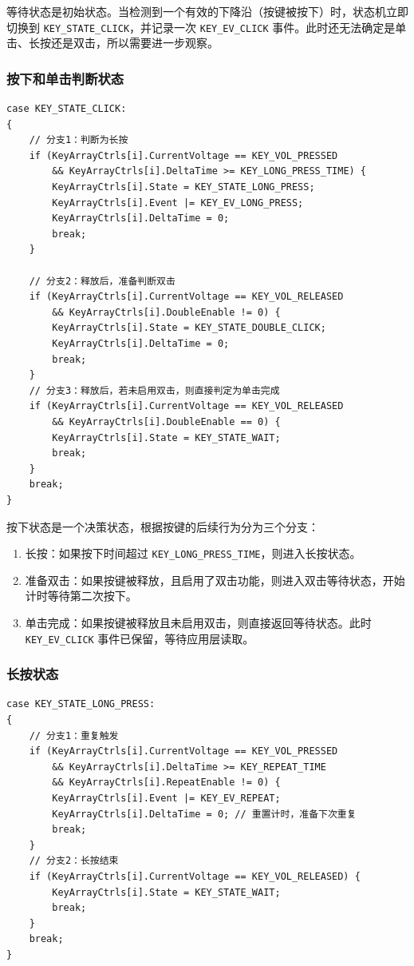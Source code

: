 等待状态是初始状态。当检测到一个有效的下降沿（按键被按下）时，状态机立即切换到 \texttt{KEY\_STATE\_CLICK}，并记录一次 \texttt{KEY\_EV\_CLICK} 事件。此时还无法确定是单击、长按还是双击，所以需要进一步观察。

\subsubsection{按下和单击判断状态}

\begin{lstlisting}[style=c]
case KEY_STATE_CLICK:
{
    // 分支1：判断为长按
    if (KeyArrayCtrls[i].CurrentVoltage == KEY_VOL_PRESSED
        && KeyArrayCtrls[i].DeltaTime >= KEY_LONG_PRESS_TIME) {
        KeyArrayCtrls[i].State = KEY_STATE_LONG_PRESS;
        KeyArrayCtrls[i].Event |= KEY_EV_LONG_PRESS;
        KeyArrayCtrls[i].DeltaTime = 0;
        break;
    }

    // 分支2：释放后，准备判断双击
    if (KeyArrayCtrls[i].CurrentVoltage == KEY_VOL_RELEASED
        && KeyArrayCtrls[i].DoubleEnable != 0) {
        KeyArrayCtrls[i].State = KEY_STATE_DOUBLE_CLICK;
        KeyArrayCtrls[i].DeltaTime = 0;
        break;
    }
    // 分支3：释放后，若未启用双击，则直接判定为单击完成
    if (KeyArrayCtrls[i].CurrentVoltage == KEY_VOL_RELEASED
        && KeyArrayCtrls[i].DoubleEnable == 0) {
        KeyArrayCtrls[i].State = KEY_STATE_WAIT;
        break;
    }
    break;
}
\end{lstlisting}

按下状态是一个决策状态，根据按键的后续行为分为三个分支：

\begin{enumerate}
\item 长按：如果按下时间超过 \texttt{KEY\_LONG\_PRESS\_TIME}，则进入长按状态。
\item 准备双击：如果按键被释放，且启用了双击功能，则进入双击等待状态，开始计时等待第二次按下。
\item 单击完成：如果按键被释放且未启用双击，则直接返回等待状态。此时 \texttt{KEY\_EV\_CLICK} 事件已保留，等待应用层读取。
\end{enumerate}

\subsubsection{长按状态}

\begin{lstlisting}[style=c]
case KEY_STATE_LONG_PRESS:
{
    // 分支1：重复触发
    if (KeyArrayCtrls[i].CurrentVoltage == KEY_VOL_PRESSED
        && KeyArrayCtrls[i].DeltaTime >= KEY_REPEAT_TIME
        && KeyArrayCtrls[i].RepeatEnable != 0) {
        KeyArrayCtrls[i].Event |= KEY_EV_REPEAT;
        KeyArrayCtrls[i].DeltaTime = 0; // 重置计时，准备下次重复
        break;
    }
    // 分支2：长按结束
    if (KeyArrayCtrls[i].CurrentVoltage == KEY_VOL_RELEASED) {
        KeyArrayCtrls[i].State = KEY_STATE_WAIT;
        break;
    }
    break;
}
\end{lstlisting}

